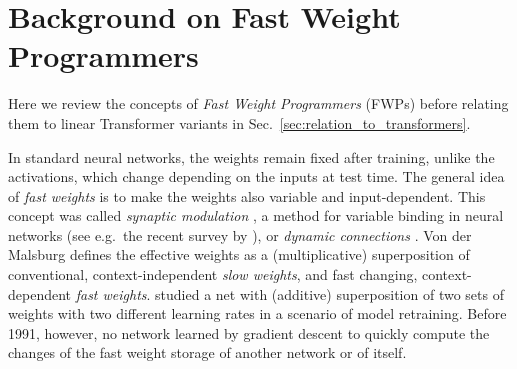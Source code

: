 \documentclass{article}
\theoremstyle{definition}
\begin{document}
\section{Background on Fast Weight Programmers}
\label{sec:fastweights}
Here we review the concepts of \textit{Fast Weight Programmers} (FWPs)
before relating them to linear Transformer variants in Sec.~\ref{sec:relation_to_transformers}.

In standard neural networks, the weights remain fixed after training,
unlike the activations, which change depending on the inputs at test time.
The general idea of \textit{fast weights} is to make the weights also 
variable and input-dependent.
This concept was called \textit{synaptic modulation} 
\citep{von1981correlation},
a method for variable binding in neural networks
(see e.g.~the recent survey by \citet{greff2020binding}),
or \textit{dynamic connections} \citep{feldman1982dynamic}.
Von der Malsburg defines the effective weights as a (multiplicative) superposition of conventional,
context-independent \textit{slow weights}, and fast changing,
context-dependent \textit{fast weights}.
 \citet{hinton1987using} studied
a net with  (additive) superposition of two sets of weights
with two different learning rates
in a scenario of model retraining. Before 1991, however, no network learned by gradient descent to quickly compute the changes of the fast weight storage of another network or of itself.
\end{document}
